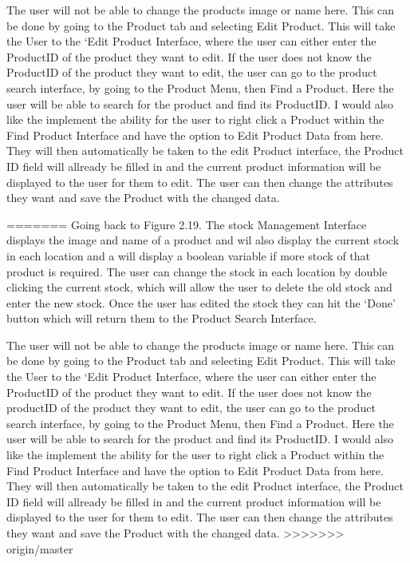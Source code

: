 The user will not be able to change the products image or name here. This can be done by going to the Product tab and selecting Edit Product. This will take the User to the `Edit Product Interface, where the user can either enter the ProductID of the product they want to edit. If the user does not know the ProductID of the product they want to edit, the user can go to the product search interface, by going to the Product Menu, then Find a Product. Here the user will be able to search for the product and find its ProductID. I would also like the implement the ability for the user to right click a Product within the Find Product Interface and have the option to Edit Product Data from here. They will then automatically be taken to the edit Product interface, the Product ID field will allready be filled in and the current product information will be displayed to the user for them to edit. The user can then change the attributes they want and save the Product with the changed data. 


=======
Going back to Figure 2.19. The stock Management Interface displays the image and name of a product and wil also display the current stock in each location and a will display a boolean variable if more stock of that product is required. The user can change the stock in each location by double clicking the current stock, which will allow the user to delete the old stock and enter the new stock. Once the user has edited the stock they can hit the `Done' button which will return them to the Product Search Interface.\par

The user will not be able to change the products image or name here. This can be done by going to the Product tab and selecting Edit Product. This will take the User to the `Edit Product Interface, where the user can either enter the ProductID of the product they want to edit. If the user does not know the productID of the product they want to edit, the user can go to the product search interface, by going to the Product Menu, then Find a Product. Here the user will be able to search for the product and find its ProductID. I would also like the implement the ability for the user to right click a Product within the Find Product Interface and have the option to Edit Product Data from here. They will then automatically be taken to the edit Product interface, the Product ID field will allready be filled in and the current product information will be displayed to the user for them to edit. The user can then change the attributes they want and save the Product with the changed data. 
>>>>>>> origin/master

